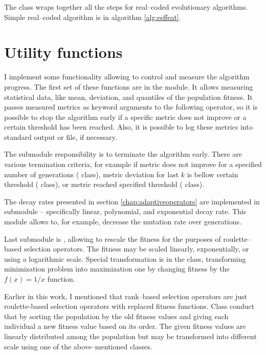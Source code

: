 The  class wraps together all the steps for real--coded evolutionary algorithms. Simple real--coded algorithm is in algorithm \ref{alg:esffeat}.
    



\section{Utility functions}

I implement some functionality allowing to control and measure the algorithm progress. The first set of these functions are in the  module. It allows measuring statistical data, like mean, deviation, and quantiles of the population fitness. It passes measured metrics as keyword arguments to the following operator, so it is possible to stop the algorithm early if a specific metric does not improve or a certain threshold has been reached. Also, it is possible to log these metrics into standard output or file, if necessary.

The  submodule responsibility is to terminate the algorithm early. There are various termination criteria, for example if metric does not improve for a specified number of generations ( class), metric deviation for last $k$ is bellow certain threshold ( class), or metric reached specified threshold ( class).

The decay rates presented in section \ref{chap:adaptiveoperators} are implemented in submodule  -- specifically linear, polynomial, and exponential decay rate. This module allows to, for example, decrease the mutation rate over generations.

Last submodule is , allowing to rescale the fitness for the purposes of roulette--based selection operators. The fitness may be scaled linearly, exponentially, or using a logarithmic scale. Special transformation is in the  class, transforming minimization problem into maximization one by changing fitness by the $f(x)=1/x$ function.

Earlier in this work, I mentioned that rank--based selection operators are just roulette-based selection operators with replaced fitness functions. Class  conduct that by sorting the population by the old fitness values and giving each individual a new fitness value based on its order. The given fitness values are linearly distributed among the population but may be transformed into different scale using one of the above--mentioned classes.




